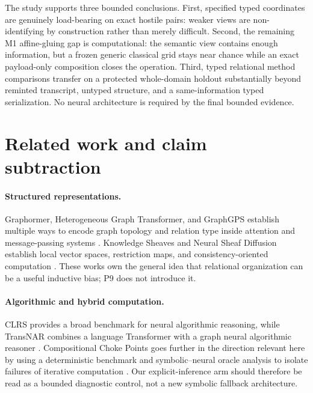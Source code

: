 \documentclass[10pt]{article}
\begin{document}
The study supports three bounded conclusions. First, specified typed coordinates are genuinely load-bearing on exact hostile pairs: weaker views are non-identifying by construction rather than merely difficult. Second, the remaining M1 affine-gluing gap is computational: the semantic view contains enough information, but a frozen generic classical grid stays near chance while an exact payload-only composition closes the operation. Third, typed relational method comparisons transfer on a protected whole-domain holdout substantially beyond reminted transcript, untyped structure, and a same-information typed serialization. No neural architecture is required by the final bounded evidence.

\section{Related work and claim subtraction}

\paragraph{Structured representations.}
Graphormer, Heterogeneous Graph Transformer, and GraphGPS establish multiple ways to encode graph topology and relation type inside attention and message-passing systems \citep{ying2021graphormer,hu2020hgt,rampasek2022gps}. Knowledge Sheaves and Neural Sheaf Diffusion establish local vector spaces, restriction maps, and consistency-oriented computation \citep{gebhart2021knowledge,bodnar2022sheaf}. These works own the general idea that relational organization can be a useful inductive bias; P9 does not introduce it.

\paragraph{Algorithmic and hybrid computation.}
CLRS provides a broad benchmark for neural algorithmic reasoning, while TransNAR combines a language Transformer with a graph neural algorithmic reasoner \citep{velickovic2022clrs,bounsi2024transnar}. Compositional Choke Points goes further in the direction relevant here by using a deterministic benchmark and symbolic--neural oracle analysis to isolate failures of iterative computation \citep{anonymous2026chokepoints}. Our explicit-inference arm should therefore be read as a bounded diagnostic control, not a new symbolic fallback architecture.
\end{document}
